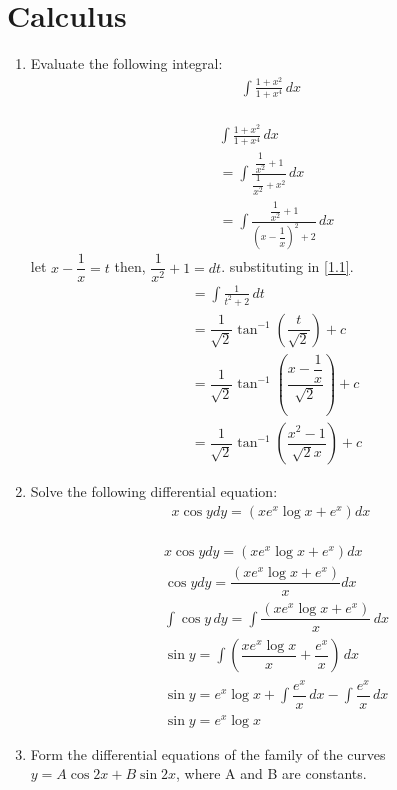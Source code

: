 \documentclass[journal,12pt,twocolumn]{IEEEtran}
\renewcommand\thesection{\arabic{section}}
\begin{document}
 \section{Calculus}
\renewcommand{\theequation}{\theenumi}
\begin{enumerate}[label=\thesection.\arabic*.,ref=\thesection.\theenumi]
\item Evaluate the following integral:
\begin{align}
 \int \displaystyle\frac{1+x^2}{1+x^4}\,dx \nonumber
\end{align}
\solution \\
\begin{align}
&\int \displaystyle\frac{1+x^2}{1+x^4}\,dx \\
& = \int \displaystyle\frac{\dfrac{1}{x^2}+1}{\dfrac{1}{x^2}+x^2}\,dx \\
& = \int \displaystyle\frac{\dfrac{1}{x^2}+1}{\left(x - \dfrac{1}{x}\right)^2+2}\,dx \label{1.1}
\end{align}
let $x - \dfrac{1}{x} = t$ then, $\dfrac{1}{x^2}+1 =dt$. substituting in \eqref{1.1}.
\begin{align}
& = \int \displaystyle\frac{1}{t^2+2}\, dt\\
& = \dfrac{1}{\sqrt{2}}\tan ^{-1}\left(\dfrac{t}{\sqrt{2}}\right)+c\\
& = \dfrac{1}{\sqrt{2}}\tan ^{-1}\left(\dfrac{x - \dfrac{1}{x}}{\sqrt{2}}\right)+c\\
& = \dfrac{1}{\sqrt{2}}\tan ^{-1}\left(\dfrac{x^2 - 1}{\sqrt{2}x}\right)+c
\end{align}
\item Solve the following differential equation:
\begin{align}
x \cos y dy=(xe^x\log x + e^x) dx\nonumber
\end{align}
\solution\\
\begin{align}
&x \cos y dy=(xe^x\log x + e^x) dx \\
&\cos y dy=\dfrac{(xe^x\log x + e^x)}{x} dx \\
& \int \cos y\, dy =  \int \dfrac{(xe^x\log x + e^x)}{x}\, dx \\
& \sin y = \int \left(\dfrac{xe^x\log x}{x} + \dfrac{e^x}{x}\right)\, dx \\
& \sin y = e^x\log x + \int \dfrac{e^x}{x}\, dx - \int \dfrac{e^x}{x}\, dx \\
&  \sin y = e^x\log x
\end{align}
\item Form the differential equations of the family of the curves $y = A\cos 2x + B\sin 2x$, where A and B are constants.\\

\end{enumerate}
\end{document}
